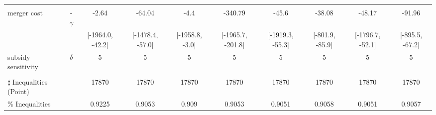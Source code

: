 \begin{tabular}{@{\extracolsep{5pt}}lccccccccc}
 &  &  &  &  &  &  &  &  &  \\
merger cost & -$\gamma$ & -2.64 & -64.04 & -4.4 & -340.79 & -45.6 & -38.08 & -48.17 & -91.96 \\
 &  & [-1964.0, -42.2] & [-1478.4, -57.0] & [-1958.8, -3.0] & [-1965.7, -201.8] & [-1919.3, -55.3] & [-801.9, -85.9] & [-1796.7, -52.1] & [-895.5, -67.2] \\
subsidy sensitivity & $\delta$ & 5 & 5 & 5 & 5 & 5 & 5 & 5 & 5 \\
 &  &  &  &  &  &  &  &  &  \\
\hline 
$\sharp$ Inequalities (Point) &  & 17870 & 17870 & 17870 & 17870 & 17870 & 17870 & 17870 & 17870 \\
\% Inequalities &  & 0.9225 & 0.9053 & 0.909 & 0.9053 & 0.9051 & 0.9058 & 0.9051 & 0.9057 \\
\bottomrule 
\end{tabular}
